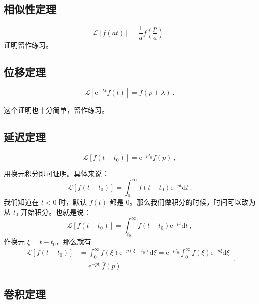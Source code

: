 \subsection{相似性定理}
\begin{equation}
\mathscr{L}[f(at)]=\frac{1}{a} \bar{f}\left(\frac{p}{a}\right)~.
\end{equation}
证明留作练习。

\subsection{位移定理}
\begin{equation}
\mathscr{L}[\mathrm{e}^{-\lambda t} f(t)]= \bar{f}(p+\lambda)~.
\end{equation}

这个证明也十分简单，留作练习。

\subsection{延迟定理}
\begin{equation}
\mathscr{L}\left [f\left(t-t_{0}\right)\right] =\mathrm{e}^{-p t_{0}} \bar f(p)~,
\end{equation}

用换元积分即可证明。具体来说：
\begin{equation}
\mathscr L\left [f\left(t-t_{0}\right)\right] =\int_{0}^{\infty} f\left(t-t_{0}\right) \mathrm{e}^{-p t} \mathrm{d} t~.
\end{equation}
我们知道在 $t<0$ 时，默认 $f(t)$ 都是 $0$。那么我们做积分的时候，时间可以改为从 $t_0$ 开始积分。也就是说：
\begin{equation}
\mathscr L\left [f\left(t-t_{0}\right)\right] =\int_{t_0}^{\infty} f\left(t-t_{0}\right) \mathrm{e}^{-p t} \mathrm{d} t~,
\end{equation}
作换元 $\xi=t-t_0$，那么就有
\begin{equation}
\begin{aligned} \mathscr L\left[f\left(t-t_{0}\right)\right] &=\int_{0}^{\infty} f(\xi) \mathrm{e}^{-p\left(\xi+t_{0}\right)} \mathrm{d} \xi=\mathrm{e}^{-p t_{0}} \int_{0}^{\infty} f(\xi) \mathrm{e}^{-p \xi} \mathrm{d} \xi \\ &=\mathrm{e}^{-p t_{0}} \bar{f}(p) \end{aligned}~.
\end{equation}

\subsection{卷积定理}

